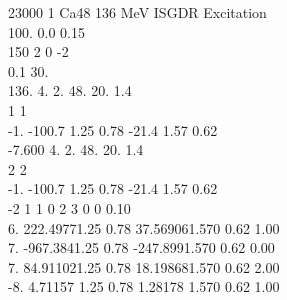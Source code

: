 \documentclass[a4paper,10pt]{article}
\begin{document}
     23000     1    Ca48  136 MeV      ISGDR Excitation\\
100.    0.0    0.15\\
150  2  0 -2\\
0.1     30.\\
136.    4.      2.      48.     20.     1.4\\
  1  1\\
-1.     -100.7  1.25    0.78            -21.4   1.57    0.62 \\
-7.600  4.      2.      48.     20.     1.4\\
  2  2\\
-1.     -100.7  1.25    0.78            -21.4   1.57    0.62 \\
 -2  1  1  0  2  3  0  0 0.10\\
6.      222.49771.25    0.78            37.569061.570   0.62            1.00\\
7.      -967.3841.25    0.78            -247.8991.570   0.62            0.00\\
7.      84.911021.25    0.78            18.198681.570   0.62            2.00\\
-8.     4.71157 1.25    0.78            1.28178 1.570   0.62            1.00\\
\end{document}
